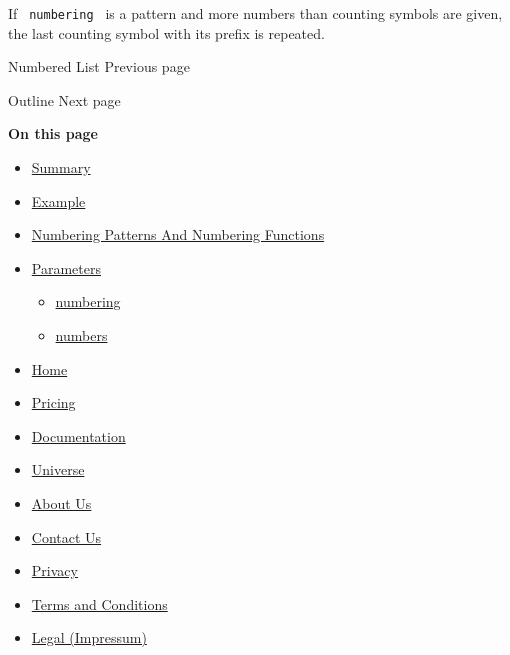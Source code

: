 If \texttt{\ numbering\ } is a pattern and more numbers than counting
symbols are given, the last counting symbol with its prefix is repeated.

\href{/docs/reference/model/enum/}{\pandocbounded{}}

{ Numbered List } { Previous page }

\href{/docs/reference/model/outline/}{\pandocbounded{}}

{ Outline } { Next page }

\textbf{On this page}

\begin{itemize}
\tightlist
\item
  \hyperref[summary]{Summary}
\item
  \hyperref[example]{Example}
\item
  \hyperref[numbering-patterns-and-numbering-functions]{Numbering
  Patterns And Numbering Functions}
\item
  \hyperref[parameters]{Parameters}

  \begin{itemize}
  \tightlist
  \item
    \hyperref[parameters-numbering]{numbering}
  \item
    \hyperref[parameters-numbers]{numbers}
  \end{itemize}
\end{itemize}

\begin{itemize}
\tightlist
\item
  \href{/}{Home}
\item
  \href{/pricing/}{Pricing}
\item
  \href{/docs/}{Documentation}
\item
  \href{/universe/}{Universe}
\item
  \href{/about/}{About Us}
\item
  \href{/contact/}{Contact Us}
\item
  \href{/privacy/}{Privacy}
\item
  \href{https://typst.app/terms}{Terms and Conditions}
\item
  \href{/legal/}{Legal (Impressum)}
\end{itemize}

